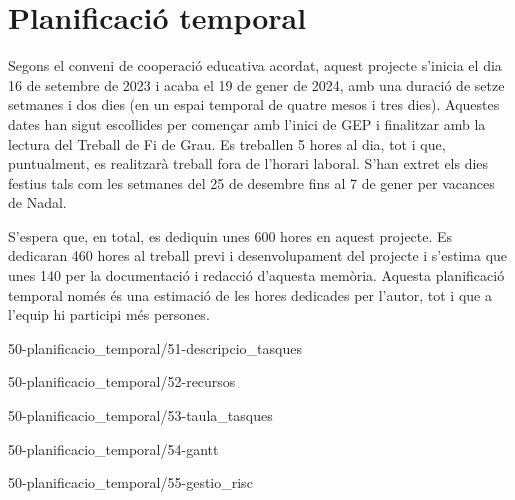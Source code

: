\chapter{Planificació temporal}

Segons el conveni de cooperació educativa acordat, aquest projecte s'inicia el dia 16 de setembre de 2023 i acaba el 19 de gener de 2024, amb una duració de setze setmanes i dos dies (en un espai temporal de quatre mesos i tres dies). Aquestes dates han sigut escollides per començar amb l'inici de GEP i finalitzar amb la lectura del Treball de Fi de Grau. Es treballen 5 hores al dia, tot i que, puntualment, es realitzarà treball fora de l'horari laboral. S'han extret els dies festius tals com les setmanes del 25 de desembre fins al 7 de gener per vacances de Nadal.

S'espera que, en total, es dediquin unes 600 hores en aquest projecte. Es dedicaran 460 hores al treball previ i desenvolupament del projecte i s'estima que unes 140 per la documentació i redacció d'aquesta memòria. Aquesta planificació temporal només és una estimació de les hores dedicades per l'autor, tot i que a l'equip hi participi més persones.

{50-planificacio_temporal/51-descripcio_tasques}

{50-planificacio_temporal/52-recursos}

{50-planificacio_temporal/53-taula_tasques}

{50-planificacio_temporal/54-gantt}

{50-planificacio_temporal/55-gestio_risc}
